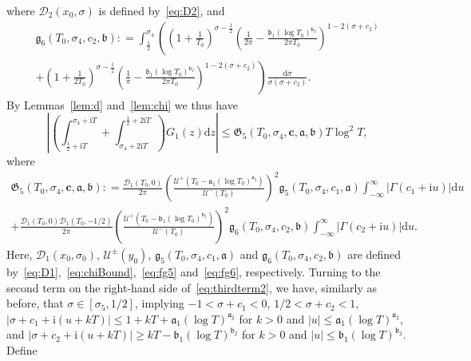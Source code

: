 \documentclass[a4paper,reqno]{amsart}
\theoremstyle{definition}
\newcommand{\de}[0]{\mathrel{\mathop:}=}
\newcommand{\ie}[0]{\mathrm{i}}
\newcommand{\dif}[1]{\mathrm{d}#1}
\begin{document}
where $\mathcal{D}_2(x_0,\sigma)$ is defined by~\eqref{eq:D2}, and
\begin{multline}
\label{eq:fg6}
\mathfrak{g}_{6}\left(T_0,\sigma_4,c_2,\bm{\mathfrak{b}}\right) \de \int_{\frac{1}{2}}^{\sigma_4}\left(\left(1+\frac{1}{T_0}\right)^{\sigma-\frac{1}{2}}\left(\frac{1}{2\pi}-\frac{\mathfrak{b}_{1}(\log{T_0})^{\mathfrak{b}_{2}}}{2\pi T_0}\right)^{1-2(\sigma+c_2)}\right.\\
\left.+\left(1+\frac{1}{2T_0}\right)^{\sigma-\frac{1}{2}}\left(\frac{1}{\pi}-\frac{\mathfrak{b}_{1}(\log{T_0})^{\mathfrak{b}_{2}}}{2\pi T_0}\right)^{1-2(\sigma+c_2)}\right)\frac{\dif{\sigma}}{\sigma(\sigma+c_2)}.  
\end{multline}
By Lemmas~\ref{lem:d} and~\ref{lem:chi} we thus have
\begin{equation}
\label{eq:G1res}
\left|\left(\int_{\frac{1}{2}+\ie T}^{\sigma_4+\ie T}+\int_{\sigma_4+2\ie T}^{\frac{1}{2}+2\ie T}\right)G_1(z)\dif{z}\right| \leq \mathfrak{G}_{5}\left(T_0,\sigma_4,\bm{c},\bm{\mathfrak{a}},\bm{\mathfrak{b}}\right)T\log^{2}{T},
\end{equation}
where
\begin{multline}
\label{eq:fG5}
\mathfrak{G}_{5}\left(T_0,\sigma_4,\bm{c},\bm{\mathfrak{a}},\bm{\mathfrak{b}}\right) \de \frac{\mathcal{D}_{1}(T_0,0)}{2\pi}\left(\frac{\mathcal{U}^{+}\left(T_0-\mathfrak{a}_{1}(\log{T_0})^{\mathfrak{a}_{2}}\right)}{\mathcal{U}^{-}(T_0)}\right)^{2}\mathfrak{g}_{5}\left(T_0,\sigma_4,c_1,\bm{\mathfrak{a}}\right)\int_{-\infty}^{\infty}\left|\Gamma(c_1+\ie u)\right|\dif{u} \\
+ \frac{\mathcal{D}_{1}(T_0,0)\mathcal{D}_{1}(T_0,-1/2)}{2\pi}\left(\frac{\mathcal{U}^{+}\left(T_0-\mathfrak{b}_{1}(\log{T_0})^{\mathfrak{b}_{2}}\right)}{\mathcal{U}^{-}(T_0)}\right)^{2}\mathfrak{g}_{6}\left(T_0,\sigma_4,c_2,\bm{\mathfrak{b}}\right)\int_{-\infty}^{\infty}\left|\Gamma(c_2+\ie u)\right|\dif{u}.
\end{multline}
Here, $\mathcal{D}_{1}(x_0,\sigma_0)$, $\mathcal{U}^{\pm}(y_0)$, $\mathfrak{g}_{5}\left(T_0,\sigma_4,c_1,\bm{\mathfrak{a}}\right)$ and $\mathfrak{g}_{6}\left(T_0,\sigma_4,c_2,\bm{\mathfrak{b}}\right)$ are defined by~\eqref{eq:D1},~\eqref{eq:chiBound},~\eqref{eq:fg5} and~\eqref{eq:fg6}, respectively. Turning to the second term on the right-hand side of~\eqref{eq:thirdterm2}, we have, similarly as before, that $\sigma\in[\sigma_5,1/2]$, implying $-1<\sigma+c_1<0$, $1/2<\sigma+c_2<1$, $|\sigma+c_1+\ie(u+kT)|\leq 1+kT+\mathfrak{a}_1(\log{T})^{\mathfrak{a}_2}$ for $k>0$ and $|u|\leq \mathfrak{a}_1(\log{T})^{\mathfrak{a}_2}$, and $|\sigma+c_2+\ie(u+kT)|\geq kT-\mathfrak{b}_1(\log{T})^{\mathfrak{b}_2}$ for $k>0$ and $|u|\leq \mathfrak{b}_1(\log{T})^{\mathfrak{b}_2}$. Define
\end{document}
